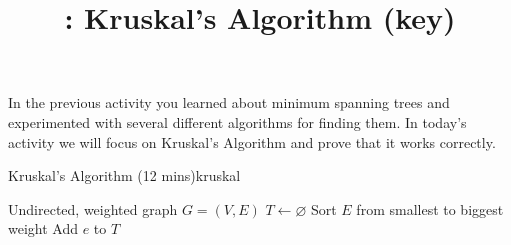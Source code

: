 \documentclass{tufte-handout}
\title{\thecourse: Kruskal's Algorithm (key)}
\date{}
\begin{document}
\maketitle

In the previous activity you learned about minimum spanning trees and
experimented with several different algorithms for finding them.  In
today's activity we will focus on Kruskal's Algorithm and prove that
it works correctly.

\begin{model*}{Kruskal's Algorithm (12 mins)}{kruskal}
  \begin{center}
    
  \end{center}

  \begin{algorithm}[H]
    \begin{algorithmic}[1]
      \Require Undirected, weighted graph $G = (V,E)$
      \State $T \gets \varnothing$   
      \State Sort $E$ from smallest to biggest weight
          \State Add $e$ to $T$
        \EndIf
      \EndFor
    \end{algorithmic}
    \label{alg:kruskal}
  \end{algorithm}
\end{model*}
\end{document}

